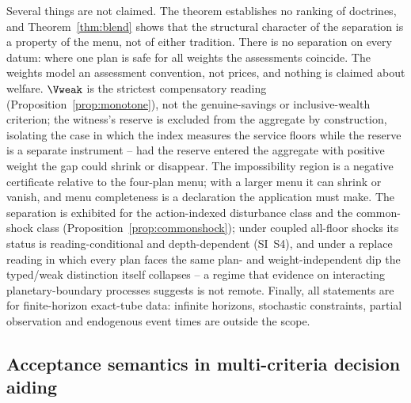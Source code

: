 Several things are not claimed. The theorem establishes no ranking of doctrines, and Theorem~\ref{thm:blend} shows that the structural character of the separation is a property of the menu, not of either tradition. There is no separation on every datum: where one plan is safe for all weights the assessments coincide. The weights model an assessment convention, not prices, and nothing is claimed about welfare. $\Vweak$ is the strictest compensatory reading (Proposition~\ref{prop:monotone}), not the genuine-savings or inclusive-wealth criterion; the witness's reserve is excluded from the aggregate by construction, isolating the case in which the index measures the service floors while the reserve is a separate instrument -- had the reserve entered the aggregate with positive weight the gap could shrink or disappear. The impossibility region is a negative certificate relative to the four-plan menu; with a larger menu it can shrink or vanish, and menu completeness is a declaration the application must make. The separation is exhibited for the action-indexed disturbance class and the common-shock class (Proposition~\ref{prop:commonshock}); under coupled all-floor shocks its status is reading-conditional and depth-dependent (SI~S4), and under a replace reading in which every plan faces the same plan- and weight-independent dip the typed/weak distinction itself collapses -- a regime that evidence on interacting planetary-boundary processes \citep{Lade2020} suggests is not remote. Finally, all statements are for finite-horizon exact-tube data: infinite horizons, stochastic constraints, partial observation and endogenous event times are outside the scope.

\subsection{Acceptance semantics in multi-criteria decision aiding}\label{sec:mcda}

